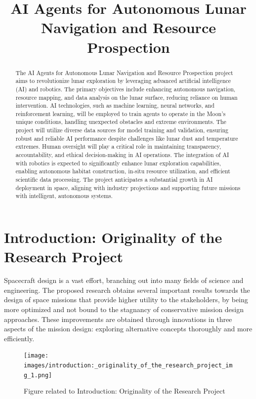 \documentclass[12pt]{article}
\title{AI Agents for Autonomous Lunar Navigation and Resource Prospection}
\author{}
\date{}
\begin{document}
\maketitle

\begin{abstract}
The AI Agents for Autonomous Lunar Navigation and Resource Prospection project aims to revolutionize lunar exploration by leveraging advanced artificial intelligence (AI) and robotics. The primary objectives include enhancing autonomous navigation, resource mapping, and data analysis on the lunar surface, reducing reliance on human intervention. AI technologies, such as machine learning, neural networks, and reinforcement learning, will be employed to train agents to operate in the Moon's unique conditions, handling unexpected obstacles and extreme environments. The project will utilize diverse data sources for model training and validation, ensuring robust and reliable AI performance despite challenges like lunar dust and temperature extremes. Human oversight will play a critical role in maintaining transparency, accountability, and ethical decision-making in AI operations. The integration of AI with robotics is expected to significantly enhance lunar exploration capabilities, enabling autonomous habitat construction, in-situ resource utilization, and efficient scientific data processing. The project anticipates a substantial growth in AI deployment in space, aligning with industry projections and supporting future missions with intelligent, autonomous systems.
\end{abstract}

\section{Introduction: Originality of the Research Project}
Spacecraft design is a vast effort, branching out into many fields of science and engineering. The proposed research obtains several important results towards the design of space missions that provide higher utility to the stakeholders, by being more optimized and not bound to the stagnancy of conservative mission design approaches. These improvements are obtained through innovations in three aspects of the mission design: exploring alternative concepts thoroughly and more efficiently.

\begin{figure}[htbp]
    \centering
    \texttt{[image: images/introduction:\_originality\_of\_the\_research\_project\_img\_1.png]}
    \caption{Figure related to Introduction: Originality of the Research Project}
    \label{fig:introduction:_originality_of_the_research_project_1}
\end{figure}
\end{document}
